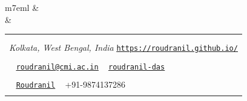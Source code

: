 \documentclass[11pt]{extarticle}
\makeatletter
\newcommand*{\mapsymbol}{%
    \BeginAccSupp{method=hex,unicode,ActualText=Location:}%
        \faMapMarker*%
    \EndAccSupp{}
}%
\newcommand*{\linkedinsymbol}{%
\protect\BeginAccSupp{ActualText=LinkedIn:}%
{{\faLinkedin}~}%
\protect\EndAccSupp{}}%
\newcommand*{\phonesymbol}{%
\protect\BeginAccSupp{ActualText=Telephone:}%
{{\faPhone}~}%
\protect\EndAccSupp{}}%
\newcommand*{\emailsymbol}{%
\protect\BeginAccSupp{ActualText=Email:}%
{{\faEnvelope}~}%
\protect\EndAccSupp{}}%
\newcommand*{\githubsymbol}{%
\protect\BeginAccSupp{ActualText=GitHub:}%
{{\faGithub}~}%
\protect\EndAccSupp{}}%
\newcommand*{\websitesymbol}{%
\protect\BeginAccSupp{ActualText=Personal Website:}%
{{\faGlobe}}%
\protect\EndAccSupp{}}%
\newcommand{\link}[2]{
    \BeginAccSupp{method = pdfstringdef, ActualText = {\protect\unichar{"000A}#2\protect\unichar{"000A}}}
        \href{#2}{\texttt{\ul{#1}}}
    \EndAccSupp{}
}
\newcommand{\mail}{
    \BeginAccSupp{method = pdfstringdef, ActualText = {\protect\unichar{"000A}roudranil@cmi.ac.in\protect\unichar{"000A}}}
        \href{mailto:roudranil@cmi.ac.in}{\texttt{\ul{roudranil@cmi.ac.in}}}
    \EndAccSupp{}
}
\newcommand{\sechead}[1]{
	\BeginAccSupp{method=escape, ActualText=#1}
    {\LARGE{\color{deepblue}{\textsc{#1}}}}
	\EndAccSupp{}
}
\makeatother
\begin{document}
\vspace*{-0.5em}

\begin{tabular}[H]{m{7em}l}
	& \\[-2ex]
	 &
	\begin{tabular}{@{}l@{}}
		\BeginAccSupp{method=escape, ActualText=Name: Roudranil Das}\textcolor{deepred}{\HUGE{\color{deepblue}{\textsc{Roudranil Das}}}}\EndAccSupp{} \\\vspace{-0.1em}\\
		\mapsymbol\;\textit{Kolkata, West Bengal, India}\quad\;\websitesymbol\link{https://roudranil.github.io/}{https://roudranil.github.io/}        \\\vspace{-0.6em}\\
		\emailsymbol\mail\quad\;\linkedinsymbol\link{roudranil-das}{https://www.linkedin.com/in/roudranil-das/}\quad\;   \\\vspace{-0.6em}\\
		\githubsymbol\link{Roudranil}{https://github.com/Roudranil}\quad\;\phonesymbol+91-9874137286      \\\vspace{-0.6em}
	\end{tabular}
\end{tabular}\\




\end{document}
